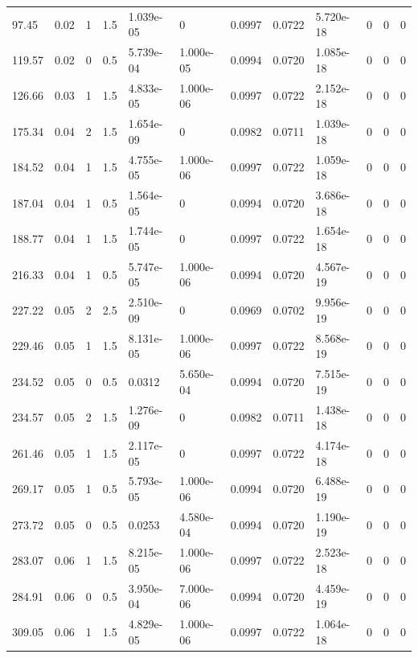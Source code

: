 \documentclass[preview]{standalone}
\begin{document}
{{\begin{tabular}{L{1.2cm}C{1.2cm} C{0.3cm}C{0.5cm} C{1.4cm}C{1.4cm} C{1.4cm}C{1.4cm} C{1.6cm}C{1.6cm} C{1.6cm}C{1.6cm}}
  97.45  &  0.02  & 1     & 1.5 &  1.039e-05  & 0  &  0.0997&   0.0722& 5.720e-18 & 0   &  0 & 0  \\ 
  119.57  &  0.02  & 0     & 0.5 &  5.739e-04  & 1.000e-05  &  0.0994&   0.0720& 1.085e-18 & 0   &  0 & 0  \\ 
  126.66  &  0.03  & 1     & 1.5 &  4.833e-05  & 1.000e-06  &  0.0997&   0.0722& 2.152e-18 & 0   &  0 & 0  \\ 
  175.34  &  0.04  & 2     & 1.5 &  1.654e-09  & 0  &  0.0982&   0.0711& 1.039e-18 & 0   &  0 & 0  \\ 
  184.52  &  0.04  & 1     & 1.5 &  4.755e-05  & 1.000e-06  &  0.0997&   0.0722& 1.059e-18 & 0   &  0 & 0  \\ 
  187.04  &  0.04  & 1     & 0.5 &  1.564e-05  & 0  &  0.0994&   0.0720& 3.686e-18 & 0   &  0 & 0  \\ 
  188.77  &  0.04  & 1     & 1.5 &  1.744e-05  & 0  &  0.0997&   0.0722& 1.654e-18 & 0   &  0 & 0  \\ 
  216.33  &  0.04  & 1     & 0.5 &  5.747e-05  & 1.000e-06  &  0.0994&   0.0720& 4.567e-19 & 0   &  0 & 0  \\ 
  227.22  &  0.05  & 2     & 2.5 &  2.510e-09  & 0  &  0.0969&   0.0702& 9.956e-19 & 0   &  0 & 0  \\ 
  229.46  &  0.05  & 1     & 1.5 &  8.131e-05  & 1.000e-06  &  0.0997&   0.0722& 8.568e-19 & 0   &  0 & 0  \\ 
  234.52  &  0.05  & 0     & 0.5 &  0.0312  & 5.650e-04  &  0.0994&   0.0720& 7.515e-19 & 0   &  0 & 0  \\ 
  234.57  &  0.05  & 2     & 1.5 &  1.276e-09  & 0  &  0.0982&   0.0711& 1.438e-18 & 0   &  0 & 0  \\ 
  261.46  &  0.05  & 1     & 1.5 &  2.117e-05  & 0  &  0.0997&   0.0722& 4.174e-18 & 0   &  0 & 0  \\ 
  269.17  &  0.05  & 1     & 0.5 &  5.793e-05  & 1.000e-06  &  0.0994&   0.0720& 6.488e-19 & 0   &  0 & 0  \\ 
  273.72  &  0.05  & 0     & 0.5 &  0.0253  & 4.580e-04  &  0.0994&   0.0720& 1.190e-19 & 0   &  0 & 0  \\ 
  283.07  &  0.06  & 1     & 1.5 &  8.215e-05  & 1.000e-06  &  0.0997&   0.0722& 2.523e-18 & 0   &  0 & 0  \\ 
  284.91  &  0.06  & 0     & 0.5 &  3.950e-04  & 7.000e-06  &  0.0994&   0.0720& 4.459e-19 & 0   &  0 & 0  \\ 
  309.05  &  0.06  & 1     & 1.5 &  4.829e-05  & 1.000e-06  &  0.0997&   0.0722& 1.064e-18 & 0   &  0 & 0  \\ 

\end{tabular}}}
\end{document}
